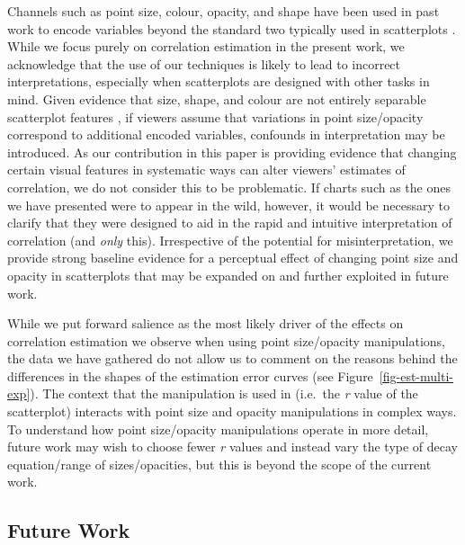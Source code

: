 \documentclass[sigconf]{acmart}
\begin{document}
Channels such as point size, colour, opacity, and shape have been used
in past work to encode variables beyond the standard two typically used
in scatterplots \citep{hong_2021, smart_2019}. While we focus purely on
correlation estimation in the present work, we acknowledge that the use
of our techniques is likely to lead to incorrect interpretations,
especially when scatterplots are designed with other tasks in mind.
Given evidence that size, shape, and colour are not entirely separable
scatterplot features \citep{smart_2019}, if viewers assume that
variations in point size/opacity correspond to additional encoded
variables, confounds in interpretation may be introduced. As our
contribution in this paper is providing evidence that changing certain
visual features in systematic ways can alter viewers' estimates of
correlation, we do not consider this to be problematic. If charts such
as the ones we have presented were to appear in the wild, however, it
would be necessary to clarify that they were designed to aid in the
rapid and intuitive interpretation of correlation (and \emph{only}
this). Irrespective of the potential for misinterpretation, we provide
strong baseline evidence for a perceptual effect of changing point size
and opacity in scatterplots that may be expanded on and further
exploited in future work.

While we put forward salience as the most likely driver of the effects
on correlation estimation we observe when using point size/opacity
manipulations, the data we have gathered do not allow us to comment on
the reasons behind the differences in the shapes of the estimation error
curves (see Figure~\ref{fig-est-multi-exp}). The context that the
manipulation is used in (i.e.~the \emph{r} value of the scatterplot)
interacts with point size and opacity manipulations in complex ways. To
understand how point size/opacity manipulations operate in more detail,
future work may wish to choose fewer \emph{r} values and instead vary
the type of decay equation/range of sizes/opacities, but this is beyond
the scope of the current work.

\hypertarget{sec-future-work}{%
\subsection{Future Work}\label{sec-future-work}}
\end{document}
